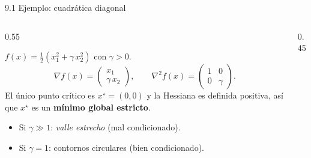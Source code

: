 \documentclass[10pt,aspectratio=169]{beamer}
\begin{document}
\begin{frame}{9.1 Ejemplo: cuadrática diagonal}
  \begin{columns}[T]
    \begin{column}{0.55\textwidth}
      \begin{example}
        $f(x) = \tfrac{1}{2}(x_1^2 + \gamma\, x_2^2)$ con $\gamma > 0$.
        \[
          \nabla f(x) = \begin{pmatrix} x_1 \\ \gamma\, x_2 \end{pmatrix},
          \qquad
          \nabla^2 f(x) = \begin{pmatrix} 1 & 0 \\ 0 & \gamma \end{pmatrix}.
        \]
        El único punto crítico es $x^\star = (0,0)$ y la Hessiana es
        definida positiva, así que $x^\star$ es un \textbf{mínimo global estricto}.
      \end{example}
      \begin{itemize}
        \item Si $\gamma \gg 1$: \emph{valle estrecho} (mal condicionado).
        \item Si $\gamma = 1$: contornos circulares (bien condicionado).
      \end{itemize}
    \end{column}
    \begin{column}{0.45\textwidth}
      \begin{center}
      \end{center}
    \end{column}
  \end{columns}
\end{frame}

\end{document}
